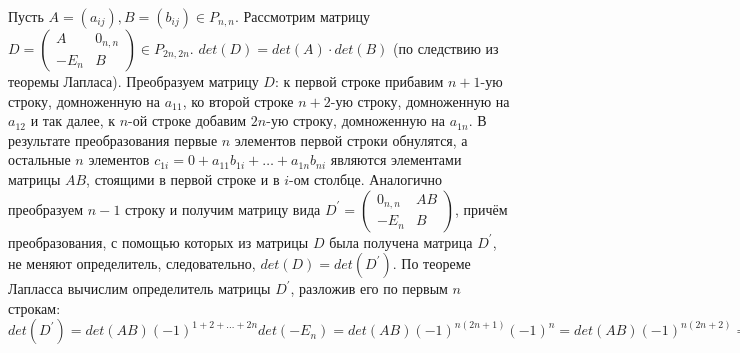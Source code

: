 \begin{Proof}
	Пусть $A = (a_{ij}), B = (b_{ij}) \in P_{n,n}$. Рассмотрим матрицу $D = \begin{pmatrix} A & 0_{n,n} \\ -E_{n} & B \end{pmatrix} \in P_{2n,2n}.$
	$det(D) = det(A)\cdot det(B)$ (по следствию из теоремы Лапласа).
	Преобразуем матрицу $D$: к первой строке прибавим $n+1$-ую строку, домноженную на $a_{11}$, ко второй строке $n+2$-ую строку, домноженную на $a_{12}$ и так далее, к $n$-ой строке добавим $2n$-ую строку, домноженную на $a_{1n}$. В результате преобразования первые $n$
	элементов первой строки обнулятся, а остальные $n$ элементов $c_{1i} = 0 + a_{11}b_{1i} + \ldots + a_{1n}b_{ni}$ являются элементами матрицы $AB$, стоящими в первой строке и в $i$-ом столбце.
	Аналогично преобразуем $n-1$ строку и получим матрицу вида $D^{'} = \begin{pmatrix} 0_{n,n} & AB \\ -E_{n} & B \end{pmatrix}$,
	причём преобразования, с помощью которых из матрицы $D$ была получена матрица $D^{'}$, не меняют определитель, следовательно, $det(D) = det(D^{'}).$ По теореме Лапласса вычислим определитель матрицы $D^{'}$, разложив его по первым $n$ строкам: $det(D^{'}) = det(AB)(-1)^{1+2+\ldots+2n}det(-E_{n}) = det(AB)(-1)^{n(2n+1)}(-1)^{n} = det(AB)(-1)^{n(2n+2)} = det(AB) \Rightarrow det(A)\cdot det(B) = det(AB).$ 
\end{Proof}



